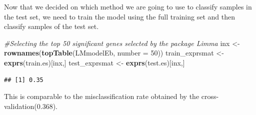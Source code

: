 \documentclass[
]{article}
\newenvironment{Shaded}{\begin{snugshade}}{\end{snugshade}}
\newcommand{\AttributeTok}[1]{\textcolor[rgb]{0.13,0.29,0.53}{#1}}
\newcommand{\CommentTok}[1]{\textcolor[rgb]{0.56,0.35,0.01}{\textit{#1}}}
\newcommand{\DecValTok}[1]{\textcolor[rgb]{0.00,0.00,0.81}{#1}}
\newcommand{\FunctionTok}[1]{\textcolor[rgb]{0.13,0.29,0.53}{\textbf{#1}}}
\newcommand{\NormalTok}[1]{#1}
\newcommand{\OtherTok}[1]{\textcolor[rgb]{0.56,0.35,0.01}{#1}}
\newcommand{\SpecialCharTok}[1]{\textcolor[rgb]{0.81,0.36,0.00}{\textbf{#1}}}
\begin{document}
Now that we decided on which method we are going to use to classify
samples in the test set, we need to train the model using the full
training set and then classify samples of the test set.

\begin{Shaded}
\begin{Highlighting}[]
\CommentTok{\#Selecting the top 50 significant genes selected by the package Limma}
\NormalTok{inx }\OtherTok{\textless{}{-}} \FunctionTok{rownames}\NormalTok{(}\FunctionTok{topTable}\NormalTok{(LMmodelEb, }\AttributeTok{number =} \DecValTok{50}\NormalTok{))}
\NormalTok{train\_exprsmat }\OtherTok{\textless{}{-}} \FunctionTok{exprs}\NormalTok{(train.es)[inx,]}
\NormalTok{test\_exprsmat }\OtherTok{\textless{}{-}} \FunctionTok{exprs}\NormalTok{(test.es)[inx,]}
\end{Highlighting}
\end{Shaded}

\begin{Shaded}
\end{Shaded}

\begin{verbatim}
## [1] 0.35
\end{verbatim}

This is comparable to the misclassification rate obtained by the
cross-validation(0.368).
\end{document}
